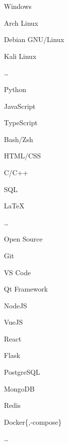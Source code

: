\SmallSep

\begin{multicols}{3}
\begin{compactitem}[\color{Cyan}$\circ$]
	\item Windows
	\item Arch Linux
	\item Debian GNU/Linux
	\item Kali Linux
	\item \ldots
\end{compactitem}
\end{multicols}

\SmallSep

\begin{multicols}{3}
\begin{compactitem}[\color{Cyan}$\circ$]
    \item Python
    \item JavaScript
    \item TypeScript
    \item Bash/Zsh
    \item HTML/CSS
    \item C/C++
    \item SQL
    \item \LaTeX
	\item \ldots
\end{compactitem}
\end{multicols}

\SmallSep

\begin{multicols}{3}
\begin{compactitem}[\color{Cyan}$\circ$]
    \item Open Source \heart\
    \item Git
    \item VS Code
    \item Qt Framework
    \item NodeJS
    \item VueJS
    \item React
    \item Flask
    \item PostgreSQL
    \item MongoDB
    \item Redis
    \item Docker\{,-compose\}
    \item \ldots
\end{compactitem}
\end{multicols}

